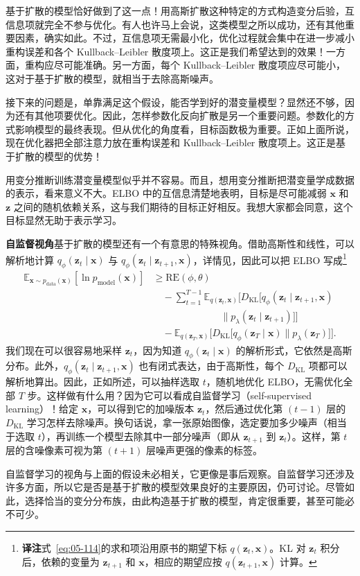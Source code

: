基于扩散的模型恰好做到了这一点！用高斯扩散这种特定的方式构造变分后验，互信息项就完全不参与优化。有人也许马上会说，这类模型之所以成功，还有其他重要因素，确实如此。不过，互信息项无需最小化，优化过程就会集中在进一步减小重构误差和各个 Kullback–Leibler 散度项上。这正是我们希望达到的效果！一方面，重构应尽可能准确。另一方面，每个 Kullback–Leibler 散度项应尽可能小，这对于基于扩散的模型，就相当于去除高斯噪声。

接下来的问题是，单靠满足这个假设，能否学到好的潜变量模型？显然还不够，因为还有其他项要优化。因此，怎样参数化反向扩散是另一个重要问题。参数化的方式影响模型的最终表现。但从优化的角度看，目标函数极为重要。正如上面所说，现在优化器把全部注意力放在重构误差和 Kullback–Leibler 散度项上。这正是基于扩散的模型的优势！

用变分推断训练潜变量模型似乎并不容易。而且，想用变分推断把潜变量学成数据的表示，看来意义不大。ELBO 中的互信息清楚地表明，目标是尽可能减弱 $\mathbf{x}$ 和 $\mathbf{z}$ 之间的随机依赖关系，这与我们期待的目标正好相反。我想大家都会同意，这个目标显然无助于表示学习。

\textbf{自监督视角}\quad 基于扩散的模型还有一个有意思的特殊视角。借助高斯性和线性，可以解析地计算 $q_\phi(\mathbf{z}_t\mid\mathbf{x})$ 与 $q_\phi(\mathbf{z}_t\mid\mathbf{z}_{t+1},\mathbf{x})$，详情见，因此可以把 ELBO 写成\footnote{\textbf{译注}\quad 式~\eqref{eq:05-114}的求和项沿用原书的期望下标 $q(\mathbf{z}_t,\mathbf{x})$。KL 对 $\mathbf{z}_t$ 积分后，依赖的变量为 $\mathbf{z}_{t+1}$ 和 $\mathbf{x}$，相应的期望应按 $q(\mathbf{z}_{t+1},\mathbf{x})$ 计算。}
\begin{equation}
\begin{aligned}
\mathbb{E}_{\mathbf{x}\sim p_{\mathrm{data}}(\mathbf{x})}[\ln p_{\mathrm{model}}(\mathbf{x})]
 &\geq\mathrm{RE}(\phi,\theta)\\
 &\quad-\sum_{t=1}^{T-1}\mathbb{E}_{q(\mathbf{z}_t,\mathbf{x})}
     \bigl[D_{\mathrm{KL}}\bigl[q_\phi(\mathbf{z}_t\mid\mathbf{z}_{t+1},\mathbf{x})\\
 &\hspace{7em}\|p_\lambda(\mathbf{z}_t\mid\mathbf{z}_{t+1})\bigr]\bigr]\\
 &\quad-\mathbb{E}_{q(\mathbf{z}_T,\mathbf{x})}
      \bigl[D_{\mathrm{KL}}\bigl[q_\phi(\mathbf{z}_T\mid\mathbf{x})\|p_\lambda(\mathbf{z}_T)\bigr]\bigr].
\end{aligned}
\tag{5.114}\label{eq:05-114}
\end{equation}
我们现在可以很容易地采样 $\mathbf{z}_t$，因为知道 $q_\phi(\mathbf{z}_t\mid\mathbf{x})$ 的解析形式，它依然是高斯分布。此外，$q_\phi(\mathbf{z}_t\mid\mathbf{z}_{t+1},\mathbf{x})$ 也有闭式表达，由于高斯性，每个 $D_{\mathrm{KL}}$ 项都可以解析地算出。因此，正如所述，可以抽样选取 $t$，随机地优化 ELBO，无需优化全部 $T$ 步。这样做有什么用？因为它可以看成自监督学习（self-supervised learning）！给定 $\mathbf{x}$，可以得到它的加噪版本 $\mathbf{z}_t$，然后通过优化第 $(t-1)$ 层的 $D_{\mathrm{KL}}$ 学习怎样去除噪声。换句话说，拿一张原始图像，选定要加多少噪声（相当于选取 $t$），再训练一个模型去除其中一部分噪声（即从 $\mathbf{z}_{t+1}$ 到 $\mathbf{z}_t$）。这样，第 $t$ 层的含噪像素可视为第 $(t+1)$ 层噪声更强的像素的标签。

自监督学习的视角与上面的假设未必相关，它更像是事后观察。自监督学习还涉及许多方面，所以它是否是基于扩散的模型效果良好的主要原因，仍可讨论。尽管如此，选择恰当的变分分布族，由此构造基于扩散的模型，肯定很重要，甚至可能必不可少。

\FloatBarrier

